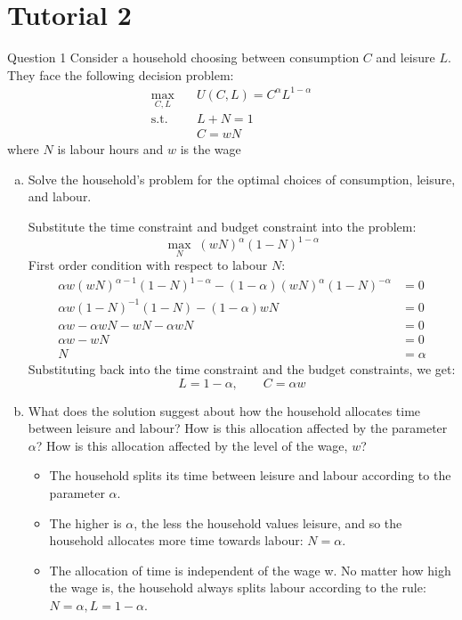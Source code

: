 \documentclass[a4paper]{article}
\begin{document}
\section{Tutorial 2}
	\begin{questionbox}{Question 1}
		Consider a household choosing between consumption \( C \) and leisure \( L \). They face the following decision problem:
		\begin{align*}
			\max_{C,L}\quad &U(C,L) = C^\alpha L^{1-\alpha}\\
			\text{s.t.}\quad &L + N = 1\\
			& C = wN
		\end{align*}
		where \( N \) is labour hours and \( w \) is the wage
		\begin{enumerate}[(a)]
			\item Solve the household's problem for the optimal choices of consumption, leisure, and labour.
			\begin{explanationbox}
				Substitute the time constraint and budget constraint into the problem:
				\[
					\max_N\;(wN)^\alpha(1-N)^{1-\alpha}
				\]
				First order condition with respect to labour \( N \):
				\begin{align*}
					\alpha w(wN)^{\alpha-1} (1-N)^{1-\alpha} - (1-\alpha)(wN)^\alpha (1-N)^{-\alpha} &= 0\\
					\alpha w (1-N)^{-1} (1-N) - (1-\alpha)wN &= 0\\
					\alpha w - \alpha wN - wN - \alpha wN &=0\\
					\alpha w - wN &= 0\\
					N &= \alpha
				\end{align*}
				Substituting back into the time constraint and the budget constraints, we get:
				\[
					L = 1 - \alpha, \qquad C=\alpha w
				\]
			\end{explanationbox}
			\item What does the solution suggest about how the household allocates time between leisure and labour? How is this allocation affected by the parameter \( \alpha \)? How is this allocation affected by the level of the wage, \( w \)? 
			\begin{explanationbox}
				\begin{itemize}
					\item The household splits its time between leisure and labour according to the parameter \( \alpha \).
					\item The higher is \( \alpha \), the less the household values leisure, and so the household allocates more time towards labour: \( N = \alpha \).
					\item The allocation of time is independent of the wage w. No matter how high the wage is, the household always splits labour according to the rule: \( N = \alpha, L = 1-\alpha \).
				\end{itemize}
			\end{explanationbox}
		\end{enumerate}
	\end{questionbox}
\end{document}
